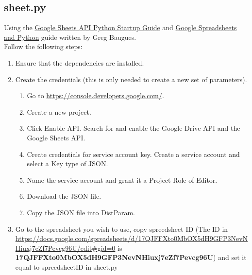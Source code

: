 \documentclass[12pt]{article}
\begin{document}
\subsection{sheet.py}
Using the \href{https://developers.google.com/sheets/api/quickstart/python}{Google Sheets API Python Startup Guide} and  \href{https://www.twilio.com/blog/2017/02/an-easy-way-to-read-and-write-to-a-google-spreadsheet-in-python.html?utm_source=youtube&utm_medium=video&utm_campaign=youtube_python_google_sheets}{Google Spreadsheets and Python} guide written by Greg Baugues.\\

Follow the following steps:\\
\begin{enumerate}
	\item Ensure that the dependencies are installed.\\
	\item Create the credentials (this is only needed to create a new set of parameters).
	\begin{enumerate}
		\item Go to \href{https://console.developers.google.com/}{https://console.developers.google.com/}.
		\item Create a new project.
		\item Click Enable API. Search for and enable the Google Drive API and the Google Sheets API.
		\item Create credentials for service account key.  Create a service account and select a Key type of JSON.  
		\item Name the service account and grant it a Project Role of Editor.
		\item Download the JSON file.
		\item Copy the JSON file into DistParam.
	\end{enumerate}
	\item Go to the spreadsheet you wish to use, copy spreedsheet ID (The ID in  \url{https://docs.google.com/spreadsheets/d/17QJFFXto0MbOX5dH9GFP3NevNHiuxj7eZf7Pevcg96U/edit#gid=0} is \textbf{17QJFFXto0MbOX5dH9GFP3NevNHiuxj7eZf7Pevcg96U}) and set it equal to spreedsheetID in sheet.py
\end{enumerate}
\end{document}
